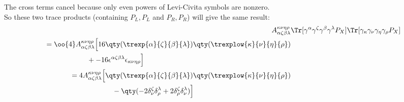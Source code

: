 The cross terms cancel because only even powers of Levi-Civita symbols are nonzero.
\\
So these two trace products (containing $P_L,P_L$ and $P_R,P_R$) will give the same result:
\begin{align}
	A_{\alpha\zeta\beta\lambda}^{\kappa\nu\eta\rho}&
	\Tr[\gamma^\alpha\gamma^\zeta\gamma^\beta\gamma^\lambda P_{X}]
	\Tr[\gamma_\kappa\gamma_\nu\gamma_\eta\gamma_\rho P_{X}]
	\\
	\begin{split}
		&=\oo{4}A_{\alpha\zeta\beta\lambda}^{\kappa\nu\eta\rho}
		\Big[
		16\qty(\trexp{\alpha}{\zeta}{\beta}{\lambda})
		\qty(\trexplow{\kappa}{\nu}{\eta}{\rho})
		\\
		&\qquad\qquad\qquad+
		-16
		\epsilon^{{\alpha}{\zeta}{\beta}{\lambda}}
		\epsilon_{\kappa\nu\eta\rho}
		\Big]
	\end{split}
	\\
	\begin{split}
		&=4A_{\alpha\zeta\beta\lambda}^{\kappa\nu\eta\rho}
		\Big[
			\qty(\trexp{\alpha}{\zeta}{\beta}{\lambda})
			\qty(\trexplow{\kappa}{\nu}{\eta}{\rho})
			\\
			&\qquad\qquad\qquad-
			\qty(-2\delta^\zeta_\nu\delta^\lambda_\rho+2\delta^\zeta_\rho\delta^\lambda_\nu)
			\Big]
	\end{split}
\end{align}
